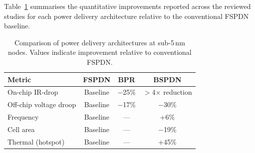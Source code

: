 Table~\ref{tab:comparison} summarises the quantitative improvements reported across the reviewed studies for each power delivery architecture relative to the conventional FSPDN baseline.

\begin{table}[h]
\centering
\caption{Comparison of power delivery architectures at sub-5\,nm nodes. Values indicate improvement relative to conventional FSPDN.}
\label{tab:comparison}
\begin{tabular}{|l|c|c|c|}
\hline
\textbf{Metric} & \textbf{FSPDN} & \textbf{BPR} & \textbf{BSPDN} \\
\hline
On-chip IR-drop & Baseline & $-$25\%\cite{9817394} & $>$4$\times$ reduction\cite{8932458} \\
\hline
Off-chip voltage droop & Baseline & $-$17\%\cite{9817394} & $-$30\%\cite{10185208} \\
\hline
Frequency & Baseline & --- & +6\%\cite{10185208} \\
\hline
Cell area & Baseline & --- & $-$19\%\cite{10631463} \\
\hline
Thermal (hotspot) & Baseline & --- & +45\%\cite{10925422} \\
\hline
\end{tabular}
\end{table}